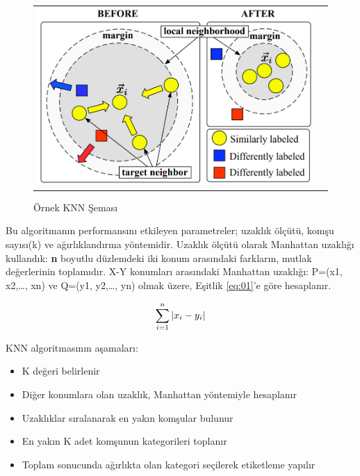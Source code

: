 \documentclass[conference]{IEEEtran}
\begin{document}
\begin{figure}[!h]
	\centering%
	\begin{center}
		\begin{tabular}{cc}%
			\includegraphics[scale=0.3]{pictures/pic_02.png}&%
		\end{tabular}%
	\end{center}
	\caption{Örnek KNN Şeması\cite{10}}%
	\label{fig:02}
\end{figure}

\quad Bu algoritmanın performansını etkileyen parametreler; uzaklık ölçütü, komşu sayısı(k) ve ağırlıklandırma yöntemidir\cite{7}. Uzaklık ölçütü olarak Manhattan uzaklığı kullandık: \textbf{n} boyutlu düzlemdeki iki konum arasındaki farkların, mutlak değerlerinin toplamıdır. X-Y konumları arasındaki Manhattan uzaklığı: P=(x1, x2,…, xn) ve Q=(y1, y2,…, yn) olmak üzere, Eşitlik \ref{eq:01}'e göre hesaplanır\cite{7}.

\begin{equation}
\label{eq:01}
\Large \sum_{i=1}^{n}\left | x_{i} - y_{i} \right |
\end{equation}

\pagebreak
KNN algoritmasının aşamaları\cite{9}:
\begin{itemize}
\item K değeri belirlenir
\item Diğer konumlara olan uzaklık, Manhattan yöntemiyle hesaplanır
\item Uzaklıklar sıralanarak en yakın komşular bulunur
\item En yakın K adet komşunun kategorileri toplanır
\item Toplam sonucunda ağırlıkta olan kategori seçilerek etiketleme yapılır
\end{itemize}
\end{document}
